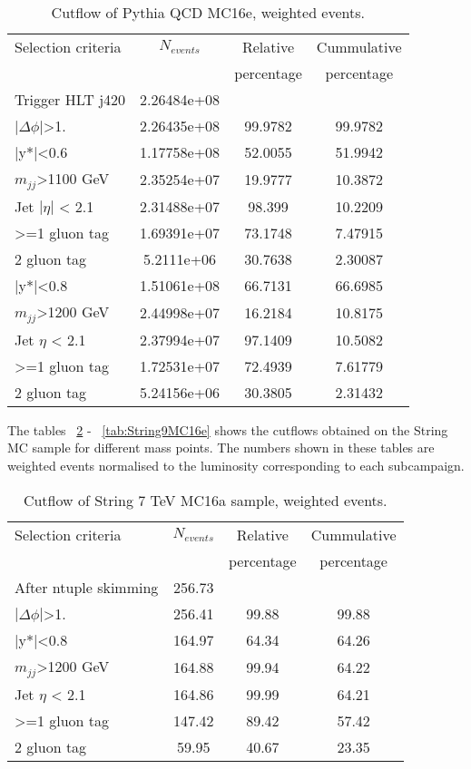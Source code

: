 \begin{table}[ht]
\begin{center}
\begin{tabular}{|l|c|c|c|}
\hline
Selection criteria & $N_{events}$ & Relative & Cummulative  \\
 & & percentage & percentage \\
\hline
Trigger HLT j420 & 2.26484e+08 &  &  \\
$|\Delta\phi|$>1. & 2.26435e+08 & 99.9782 & 99.9782 \\
\hline\hline
|y*|<0.6 & 1.17758e+08 & 52.0055 & 51.9942 \\
$m_{jj}$>1100 GeV & 2.35254e+07 & 19.9777 & 10.3872 \\
Jet $|\eta|$ < 2.1 & 2.31488e+07 & 98.399 & 10.2209 \\
>=1 gluon tag & 1.69391e+07 & 73.1748 & 7.47915 \\
2 gluon tag & 5.2111e+06 & 30.7638 & 2.30087 \\
\hline\hline
|y*|<0.8 & 1.51061e+08 & 66.7131 & 66.6985 \\
$m_{jj}$>1200 GeV & 2.44998e+07 & 16.2184 & 10.8175 \\
Jet $\eta$ < 2.1 & 2.37994e+07 & 97.1409 & 10.5082 \\
>=1 gluon tag & 1.72531e+07 & 72.4939 & 7.61779 \\
2 gluon tag & 5.24156e+06 & 30.3805 & 2.31432 \\
\hline
\end{tabular}
\end{center}
\caption{Cutflow of Pythia QCD MC16e, weighted events.}
\label{tab:bckgdcutflowMC16eWeighted}
\end{table}

The tables ~\ref{tab:String7MC16a} -  ~\ref{tab:String9MC16e} shows the cutflows obtained on the String MC sample for different mass points. The numbers shown in these tables are weighted events normalised to the luminosity corresponding to each subcampaign. 

\begin{table}[ht]
\begin{center}
\begin{tabular}{|l|c|c|c|}
\hline
Selection criteria & $N_{events}$ & Relative & Cummulative \\
 & & percentage & percentage \\
\hline
After ntuple skimming & 256.73 &  &  \\
$|\Delta\phi|$>1. & 256.41 & 99.88 & 99.88 \\
|y*|<0.8 & 164.97 & 64.34 & 64.26 \\
$m_{jj}$>1200 GeV & 164.88 & 99.94 & 64.22 \\
Jet $\eta$ < 2.1 & 164.86 & 99.99 & 64.21 \\
>=1 gluon tag & 147.42 & 89.42 & 57.42 \\
2 gluon tag & 59.95 & 40.67 & 23.35 \\
\hline
\end{tabular}
\end{center}
\caption{Cutflow of String 7 TeV MC16a sample, weighted events.}
\label{tab:String7MC16a}
\end{table}

